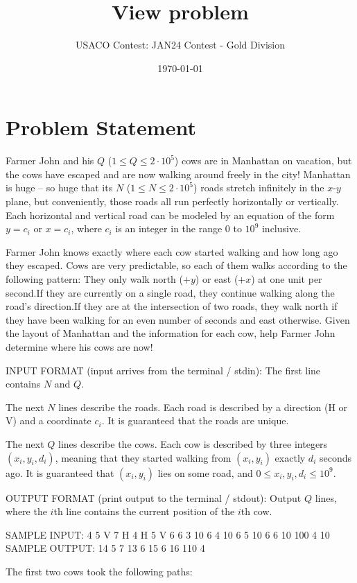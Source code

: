 \documentclass[12pt]{article}
\title{View problem}
\author{USACO Contest: JAN24 Contest - Gold Division}
\date{\today}
\begin{document}
\maketitle

\section*{Problem Statement}


Farmer John and his $Q$ ($1 \leq Q \leq 2 \cdot 10^5$) cows are in Manhattan on
vacation, but the cows have escaped and are now walking around freely in the
city! Manhattan is huge – so huge that its $N$ ($1 \le N \le 2 \cdot 10^5$)
roads stretch infinitely in the $x$-$y$ plane, but conveniently, those roads all
run perfectly horizontally or vertically. Each horizontal and vertical road can
be modeled by an equation of the form $y = c_i$ or $x = c_i$, where $c_i$ is an
integer in the range $0$ to $10^9$ inclusive.

Farmer John knows exactly where each cow started walking and how long ago they
escaped. Cows are very predictable, so each of them walks according to the
following pattern:
They only walk north ($+y$) or east ($+x$) at one unit per second.If they are currently on a single road, they continue walking along the
road's direction.If they are at the intersection of two roads, they
walk north if they have been walking for an even number of seconds and east
otherwise.
Given the layout of Manhattan and the information for each cow, help Farmer John
determine where his cows are now!

INPUT FORMAT (input arrives from the terminal / stdin):
The first line contains $N$ and $Q$.

The next $N$ lines describe the roads. Each road is described by a direction (H
or V) and a coordinate $c_i$. It is guaranteed that the roads are unique.

The next $Q$ lines describe the cows. Each cow is described by three integers
$(x_i, y_i, d_i)$, meaning that they started walking from $(x_i, y_i)$ exactly
$d_i$ seconds ago. It is guaranteed that $(x_i, y_i)$ lies on some road, and
$0 \le x_i, y_i, d_i \le 10^9$.

OUTPUT FORMAT (print output to the terminal / stdout):
Output $Q$ lines, where the $i$th line contains the current position of the
$i$th cow.

SAMPLE INPUT:
4 5
V 7
H 4
H 5
V 6
6 3 10
6 4 10
6 5 10
6 6 10
100 4 10
SAMPLE OUTPUT: 
14 5
7 13
6 15
6 16
110 4

The first two cows took the following paths:
\end{document}

